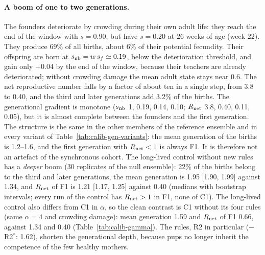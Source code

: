 \paragraph{A boom of one to two generations.}
The founders deteriorate by crowding during their own adult life: they reach the end of the window with $s=0.90$,
but have $s=0.20$ at 26 weeks of age (week 22). They produce 69\% of all births, about 6\% of their potential
fecundity. Their offspring are born at $s_{\rm nb}=w\,s_f\simeq0.19$, below the deterioration threshold, and gain only
$+0.04$ by the end of the window, because their teachers are already deteriorated; without crowding damage the mean
adult state stays near 0.6. The net reproductive number falls by a factor of about ten in a single step, from 3.8 to
0.40, and the third and later generations add 3.2\% of the births. The generational gradient is monotone
($s_{\rm nb}$ 1, 0.19, 0.14, 0.10; $R_{\rm net}$ 3.8, 0.40, 0.11, 0.05), but it is almost complete between the
founders and the first generation. The structure is the same in the other members of the reference ensemble and in
every variant of Table~\ref{tab:calib-gen-variants}: the mean generation of the births is 1.2--1.6, and the first
generation with $R_{\rm net}<1$ is always F1. It is therefore not an artefact of the synchronous cohort. The
long-lived control without new rules has a \emph{deeper} boom (30 replicates of the null ensemble): 22\% of the births
belong to the third and later generations, the mean generation is 1.95 [1.90, 1.99] against 1.34, and $R_{\rm net}$ of
F1 is 1.21 [1.17, 1.25] against 0.40 (medians with bootstrap intervals; every run of the control has $R_{\rm net}>1$ in
F1, none of \textsf{C1}). The long-lived control also differs from \textsf{C1} in $\alpha$, so the clean contrast is
\textsf{C1} without its four rules (same $\alpha=4$ and crowding damage): mean generation 1.59 and $R_{\rm net}$ of F1
0.66, against 1.34 and 0.40 (Table~\ref{tab:calib-gamma}). The rules, R2 in particular ($-$R2$^*$: 1.62), shorten the
generational depth, because pups no longer inherit the competence of the few healthy mothers.

